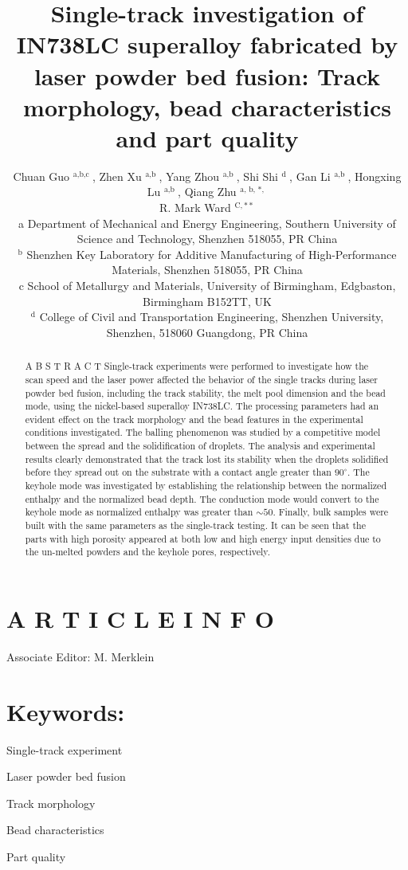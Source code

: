 \documentclass[10pt]{article}
\title{Single-track investigation of IN738LC superalloy fabricated by laser powder bed fusion: Track morphology, bead characteristics and part quality }
\author{Chuan Guo ${ }^{\text {a,b,c }}$, Zhen Xu ${ }^{\text {a,b }}$, Yang Zhou ${ }^{\text {a,b }}$, Shi Shi ${ }^{\text {d }}$, Gan Li ${ }^{\text {a,b }}$, Hongxing Lu ${ }^{\text {a,b }}$, Qiang Zhu ${ }^{\text {a, b, *, }}$\\
R. Mark Ward ${ }^{\mathrm{C}, * *}$\\
a Department of Mechanical and Energy Engineering, Southern University of Science and Technology, Shenzhen 518055, PR China\\
${ }^{\mathrm{b}}$ Shenzhen Key Laboratory for Additive Manufacturing of High-Performance Materials, Shenzhen 518055, PR China\\
c School of Metallurgy and Materials, University of Birmingham, Edgbaston, Birmingham B152TT, UK\\
${ }^{\mathrm{d}}$ College of Civil and Transportation Engineering, Shenzhen University, Shenzhen, 518060 Guangdong, PR China}
\date{}
\begin{document}
\maketitle


\section*{A R T I C L E I N F O}
Associate Editor: M. Merklein

\section*{Keywords:}
Single-track experiment

Laser powder bed fusion

Track morphology

Bead characteristics

Part quality

\begin{abstract}
A B S T R A C T Single-track experiments were performed to investigate how the scan speed and the laser power affected the behavior of the single tracks during laser powder bed fusion, including the track stability, the melt pool dimension and the bead mode, using the nickel-based superalloy IN738LC. The processing parameters had an evident effect on the track morphology and the bead features in the experimental conditions investigated. The balling phenomenon was studied by a competitive model between the spread and the solidification of droplets. The analysis and experimental results clearly demonstrated that the track lost its stability when the droplets solidified before they spread out on the substrate with a contact angle greater than $90^{\circ}$. The keyhole mode was investigated by establishing the relationship between the normalized enthalpy and the normalized bead depth. The conduction mode would convert to the keyhole mode as normalized enthalpy was greater than $\sim 50$. Finally, bulk samples were built with the same parameters as the single-track testing. It can be seen that the parts with high porosity appeared at both low and high energy input densities due to the un-melted powders and the keyhole pores, respectively.
\end{abstract}
\end{document}
